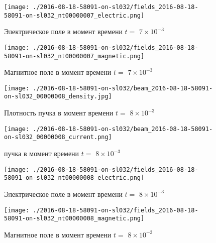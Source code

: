 \documentclass[a4paper,14pt]{extreport}
\begin{document}
\begin{center}
\begin{figure}[!hbt]
\texttt{[image: ./2016-08-18-58091-on-sl032/fields\_2016-08-18-58091-on-sl032\_nt00000007\_electric.png]}
\caption{\label{electric_7_30} Электрическое поле  в момент времени $t = $ $7\times 10^{-3}$ }
\end{figure}
\end{center}
\begin{center}
\begin{figure}[!hbt]
\texttt{[image: ./2016-08-18-58091-on-sl032/fields\_2016-08-18-58091-on-sl032\_nt00000007\_magnetic.png]}
\caption{\label{magnetic_7_31} Магнитное поле  в момент времени $t = $ $7\times 10^{-3}$ }
\end{figure}
\end{center}
\begin{center}
\begin{figure}[!hbt]
\texttt{[image: ./2016-08-18-58091-on-sl032/beam\_2016-08-18-58091-on-sl032\_00000008\_density.jpg]}
\caption{\label{density_beam8_32} Плотность пучка в момент времени $t = $ $8\times 10^{-3}$ }
\end{figure}
\end{center}
\begin{center}
\begin{figure}[!hbt]
\texttt{[image: ./2016-08-18-58091-on-sl032/beam\_2016-08-18-58091-on-sl032\_00000008\_current.png]}
\caption{\label{current_beam8_33}  пучка в момент времени $t = $ $8\times 10^{-3}$ }
\end{figure}
\end{center}
\begin{center}
\begin{figure}[!hbt]
\texttt{[image: ./2016-08-18-58091-on-sl032/fields\_2016-08-18-58091-on-sl032\_nt00000008\_electric.png]}
\caption{\label{electric_8_34} Электрическое поле  в момент времени $t = $ $8\times 10^{-3}$ }
\end{figure}
\end{center}
\begin{center}
\begin{figure}[!hbt]
\texttt{[image: ./2016-08-18-58091-on-sl032/fields\_2016-08-18-58091-on-sl032\_nt00000008\_magnetic.png]}
\caption{\label{magnetic_8_35} Магнитное поле  в момент времени $t = $ $8\times 10^{-3}$ }
\end{figure}
\end{center}
\end{document}
